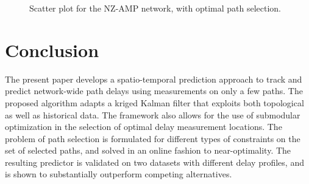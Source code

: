 \documentclass[draftcls,onecolumn,12pt]{IEEEtran}
\theoremstyle{plain}\newtheorem{thm}{Theorem}
\theoremstyle{definition}
\theoremstyle{remark}
\begin{document}
\begin{figure}
	\centering
{}
\caption{Scatter plot for the NZ-AMP network,  with optimal path selection.}
  \label{scatternz}
\end{figure}


\section{Conclusion}
The present paper develops a spatio-temporal prediction approach to track and predict network-wide path delays using measurements on only a few paths.
The proposed algorithm adapts a kriged Kalman filter that exploits both topological as well as historical data.
The framework also allows for the use of submodular optimization in the selection of optimal delay measurement locations.
The problem of path selection is formulated for different types of constraints on the set of selected paths, and solved in an online fashion to near-optimality. 
The resulting predictor is validated on two datasets with different delay profiles, and is shown to substantially outperform competing alternatives.
\end{document}
